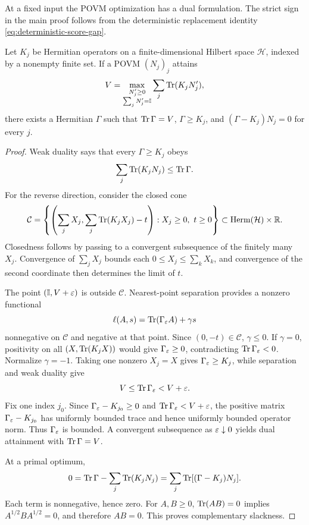 At a fixed input the POVM optimization has a dual formulation.
The strict sign in the main proof follows from the deterministic
replacement identity \eqref{eq:deterministic-score-gap}.

\begin{lemma}
\label{lem:povm-duality}
Let \(K_j\) be Hermitian operators on a finite-dimensional Hilbert space \(\mathcal H\),
indexed by a nonempty finite set. If a POVM \((N_j)_j\) attains
\[
V=\max_{\substack{N'_j\ge0\\\sum_jN'_j=\mathbb I}}\sum_j\operatorname{Tr}(K_jN'_j),
\]
there exists a Hermitian \(\Gamma\) such that \(\operatorname{Tr}\Gamma=V\),
\(\Gamma\ge K_j\), and \((\Gamma-K_j)N_j=0\) for every \(j\).
\end{lemma}

\begin{proof}
Weak duality says that every \(\Gamma\ge K_j\) obeys
\[
\sum_j\operatorname{Tr}(K_jN_j)\le\operatorname{Tr}\Gamma.
\]
For the reverse direction, consider the closed cone
\[
\mathcal C=
\left\{\left(\sum_jX_j,\sum_j\operatorname{Tr}(K_jX_j)-t\right):
X_j\ge0,\ t\ge0\right\}
\subset\operatorname{Herm}(\mathcal H)\times\mathbb R.
\]
Closedness follows by passing to a convergent subsequence of the
finitely many \(X_j\). Convergence of \(\sum_j X_j\) bounds each
\(0\le X_j\le\sum_kX_k\), and convergence of the second coordinate then
determines the limit of \(t\).

The point \((\mathbb I,V+\varepsilon)\) is outside \(\mathcal C\). Nearest-point
separation provides a nonzero functional
\[
\ell(A,s)=\operatorname{Tr}(\Gamma_\varepsilon A)+\gamma s
\]
nonnegative on \(\mathcal C\) and negative at that point. Since
\((0,-t)\in\mathcal C\), \(\gamma\le0\). If \(\gamma=0\), positivity on all
\((X,\operatorname{Tr}(K_jX))\) would give \(\Gamma_\varepsilon\ge0\), contradicting
\(\operatorname{Tr}\Gamma_\varepsilon<0\). Normalize \(\gamma=-1\). Taking one nonzero \(X_j=X\)
gives \(\Gamma_\varepsilon\ge K_j\), while separation and weak duality give
\[
V\le\operatorname{Tr}\Gamma_\varepsilon<V+\varepsilon.
\]
Fix one index \(j_0\). Since
\(\Gamma_\varepsilon-K_{j_0}\ge0\) and \(\operatorname{Tr}\Gamma_\varepsilon<V+\varepsilon\), the positive
matrix \(\Gamma_\varepsilon-K_{j_0}\) has uniformly bounded trace and hence uniformly
bounded operator norm. Thus \(\Gamma_\varepsilon\) is bounded. A convergent
subsequence as \(\varepsilon\downarrow0\) yields dual attainment with
\(\operatorname{Tr}\Gamma=V\).

At a primal optimum,
\[
0=\operatorname{Tr}\Gamma-\sum_j\operatorname{Tr}(K_jN_j)
=\sum_j\operatorname{Tr}[(\Gamma-K_j)N_j].
\]
Each term is nonnegative, hence zero. For \(A,B\ge0\),
\(\operatorname{Tr}(AB)=0\) implies \(A^{1/2}BA^{1/2}=0\), and therefore \(AB=0\).
This proves complementary slackness.
\end{proof}

